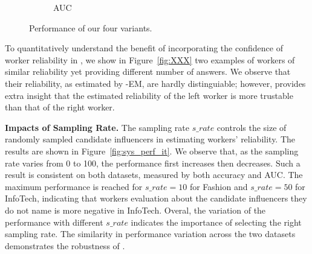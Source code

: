 \begin{figure}[htb]
\begin{subfigure}[t]{0.47\columnwidth}
    \vspace{-0.15in}
        \caption{AUC\label{fig:AUC}} 
    \end{subfigure}%
   \caption{Performance of our four variants.} \label{fig:variants}
\end{figure}

To quantitatively understand the benefit of incorporating the confidence of worker reliability in \sys, we show in Figure~\ref{fig:XXX} two examples of workers of similar reliability yet providing different number of answers. We observe that their reliability, as estimated by \sys-EM, are hardly distinguiable; however, \sys provides extra insight that the estimated reliability of the left worker is more trustable than that of the right worker.

\smallskip
\noindent\textbf{Impacts of Sampling Rate.}
The sampling rate $s\_rate$ controls the size of randomly sampled candidate influencers in estimating workers' reliability. The results are shown in Figure~\ref{fig:sys_perf_it}. We observe that, as the sampling rate varies from 0 to 100, the performance first increases then decreases. Such a result is consistent on both datasets, measured by both accuracy and AUC. The maximum performance is reached for $s\_rate= 10$ for Fashion and $s\_rate= 50$ for InfoTech, indicating that workers evaluation about the candidate influencers they do not name is more negative in InfoTech. Overal, the variation of the performance with different $s\_rate$ indicates the importance of selecting the right sampling rate. The similarity in performance variation across the two datasets demonstrates the robustness of \sys.

